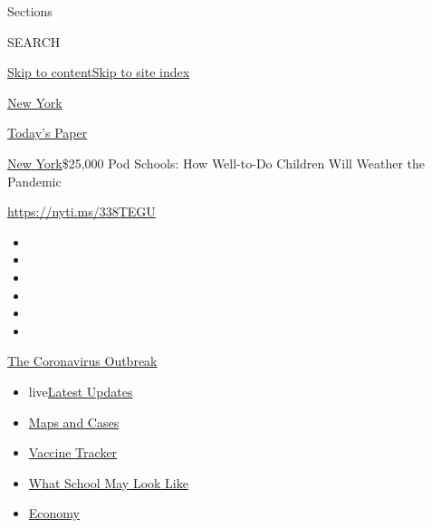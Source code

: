 Sections

SEARCH

\protect\hyperlink{site-content}{Skip to
content}\protect\hyperlink{site-index}{Skip to site index}

\href{https://www.nytimes3xbfgragh.onion/section/nyregion}{New York}

\href{https://myaccount.nytimes3xbfgragh.onion/auth/login?response_type=cookie\&client_id=vi}{}

\href{https://www.nytimes3xbfgragh.onion/section/todayspaper}{Today's
Paper}

\href{/section/nyregion}{New York}\textbar{}\$25,000 Pod Schools: How
Well-to-Do Children Will Weather the Pandemic

\url{https://nyti.ms/338TEGU}

\begin{itemize}
\item
\item
\item
\item
\item
\item
\end{itemize}

\href{https://www.nytimes3xbfgragh.onion/news-event/coronavirus?action=click\&pgtype=Article\&state=default\&region=TOP_BANNER\&context=storylines_menu}{The
Coronavirus Outbreak}

\begin{itemize}
\tightlist
\item
  live\href{https://www.nytimes3xbfgragh.onion/2020/08/02/world/coronavirus-updates.html?action=click\&pgtype=Article\&state=default\&region=TOP_BANNER\&context=storylines_menu}{Latest
  Updates}
\item
  \href{https://www.nytimes3xbfgragh.onion/interactive/2020/us/coronavirus-us-cases.html?action=click\&pgtype=Article\&state=default\&region=TOP_BANNER\&context=storylines_menu}{Maps
  and Cases}
\item
  \href{https://www.nytimes3xbfgragh.onion/interactive/2020/science/coronavirus-vaccine-tracker.html?action=click\&pgtype=Article\&state=default\&region=TOP_BANNER\&context=storylines_menu}{Vaccine
  Tracker}
\item
  \href{https://www.nytimes3xbfgragh.onion/interactive/2020/07/29/us/schools-reopening-coronavirus.html?action=click\&pgtype=Article\&state=default\&region=TOP_BANNER\&context=storylines_menu}{What
  School May Look Like}
\item
  \href{https://www.nytimes3xbfgragh.onion/live/2020/07/31/business/stock-market-today-coronavirus?action=click\&pgtype=Article\&state=default\&region=TOP_BANNER\&context=storylines_menu}{Economy}
\end{itemize}

